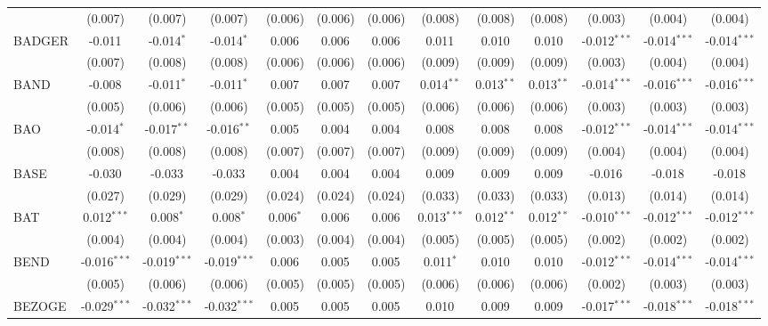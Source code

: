 \begin{table}[!htbp]
\begin{tabular}{@{\extracolsep{5pt}}lcccccccccccc}
  & (0.007) & (0.007) & (0.007) & (0.006) & (0.006) & (0.006) & (0.008) & (0.008) & (0.008) & (0.003) & (0.004) & (0.004) \\
 BADGER & -0.011$^{}$ & -0.014$^{*}$ & -0.014$^{*}$ & 0.006$^{}$ & 0.006$^{}$ & 0.006$^{}$ & 0.011$^{}$ & 0.010$^{}$ & 0.010$^{}$ & -0.012$^{***}$ & -0.014$^{***}$ & -0.014$^{***}$ \\
  & (0.007) & (0.008) & (0.008) & (0.006) & (0.006) & (0.006) & (0.009) & (0.009) & (0.009) & (0.003) & (0.004) & (0.004) \\
 BAND & -0.008$^{}$ & -0.011$^{*}$ & -0.011$^{*}$ & 0.007$^{}$ & 0.007$^{}$ & 0.007$^{}$ & 0.014$^{**}$ & 0.013$^{**}$ & 0.013$^{**}$ & -0.014$^{***}$ & -0.016$^{***}$ & -0.016$^{***}$ \\
  & (0.005) & (0.006) & (0.006) & (0.005) & (0.005) & (0.005) & (0.006) & (0.006) & (0.006) & (0.003) & (0.003) & (0.003) \\
 BAO & -0.014$^{*}$ & -0.017$^{**}$ & -0.016$^{**}$ & 0.005$^{}$ & 0.004$^{}$ & 0.004$^{}$ & 0.008$^{}$ & 0.008$^{}$ & 0.008$^{}$ & -0.012$^{***}$ & -0.014$^{***}$ & -0.014$^{***}$ \\
  & (0.008) & (0.008) & (0.008) & (0.007) & (0.007) & (0.007) & (0.009) & (0.009) & (0.009) & (0.004) & (0.004) & (0.004) \\
 BASE & -0.030$^{}$ & -0.033$^{}$ & -0.033$^{}$ & 0.004$^{}$ & 0.004$^{}$ & 0.004$^{}$ & 0.009$^{}$ & 0.009$^{}$ & 0.009$^{}$ & -0.016$^{}$ & -0.018$^{}$ & -0.018$^{}$ \\
  & (0.027) & (0.029) & (0.029) & (0.024) & (0.024) & (0.024) & (0.033) & (0.033) & (0.033) & (0.013) & (0.014) & (0.014) \\
 BAT & 0.012$^{***}$ & 0.008$^{*}$ & 0.008$^{*}$ & 0.006$^{*}$ & 0.006$^{}$ & 0.006$^{}$ & 0.013$^{***}$ & 0.012$^{**}$ & 0.012$^{**}$ & -0.010$^{***}$ & -0.012$^{***}$ & -0.012$^{***}$ \\
  & (0.004) & (0.004) & (0.004) & (0.003) & (0.004) & (0.004) & (0.005) & (0.005) & (0.005) & (0.002) & (0.002) & (0.002) \\
 BEND & -0.016$^{***}$ & -0.019$^{***}$ & -0.019$^{***}$ & 0.006$^{}$ & 0.005$^{}$ & 0.005$^{}$ & 0.011$^{*}$ & 0.010$^{}$ & 0.010$^{}$ & -0.012$^{***}$ & -0.014$^{***}$ & -0.014$^{***}$ \\
  & (0.005) & (0.006) & (0.006) & (0.005) & (0.005) & (0.005) & (0.006) & (0.006) & (0.006) & (0.002) & (0.003) & (0.003) \\
 BEZOGE & -0.029$^{***}$ & -0.032$^{***}$ & -0.032$^{***}$ & 0.005$^{}$ & 0.005$^{}$ & 0.005$^{}$ & 0.010$^{}$ & 0.009$^{}$ & 0.009$^{}$ & -0.017$^{***}$ & -0.018$^{***}$ & -0.018$^{***}$ \\

\end{tabular}
\end{table}
